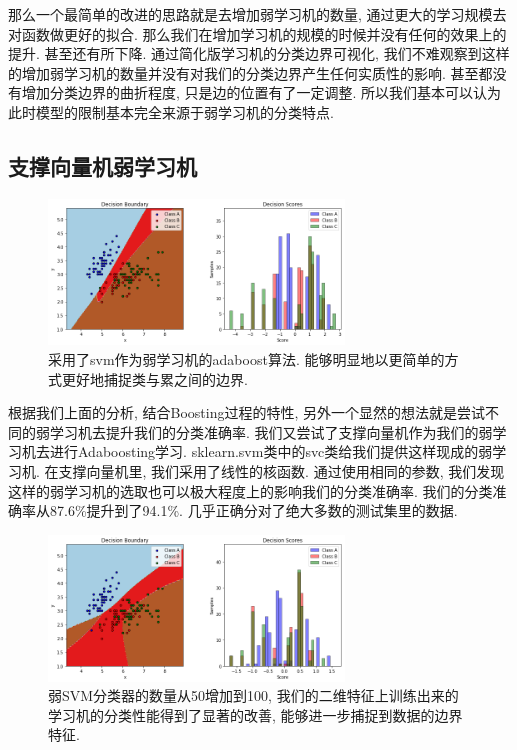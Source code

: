 \documentclass[lang=cn,11pt]{elegantpaper}
\begin{document}
那么一个最简单的改进的思路就是去增加弱学习机的数量, 通过更大的学习规模去对函数做更好的拟合. 那么我们在增加学习机的规模的时候并没有任何的效果上的提升. 甚至还有所下降. 通过简化版学习机的分类边界可视化, 我们不难观察到这样的增加弱学习机的数量并没有对我们的分类边界产生任何实质性的影响. 甚至都没有增加分类边界的曲折程度, 只是边的位置有了一定调整. 所以我们基本可以认为此时模型的限制基本完全来源于弱学习机的分类特点.






\subsection{支撑向量机弱学习机}


\begin{figure}[htbp]	
  \centering
    \includegraphics[width=0.7\textwidth]{svm50}
    \caption{采用了svm作为弱学习机的adaboost算法. 能够明显地以更简单的方式更好地捕捉类与累之间的边界.}
  \end{figure}

根据我们上面的分析, 结合Boosting过程的特性, 另外一个显然的想法就是尝试不同的弱学习机去提升我们的分类准确率. 我们又尝试了支撑向量机作为我们的弱学习机去进行Adaboosting学习. sklearn.svm类中的svc类给我们提供这样现成的弱学习机. 在支撑向量机里, 我们采用了线性的核函数. 通过使用相同的参数, 我们发现这样的弱学习机的选取也可以极大程度上的影响我们的分类准确率. 我们的分类准确率从87.6\%提升到了94.1\%. 几乎正确分对了绝大多数的测试集里的数据.

\begin{figure}[htbp]
  \centering
  \includegraphics[width=0.7\textwidth]{svm100}
  \caption{弱SVM分类器的数量从50增加到100, 我们的二维特征上训练出来的学习机的分类性能得到了显著的改善, 能够进一步捕捉到数据的边界特征.}
\end{figure}
\end{document}
